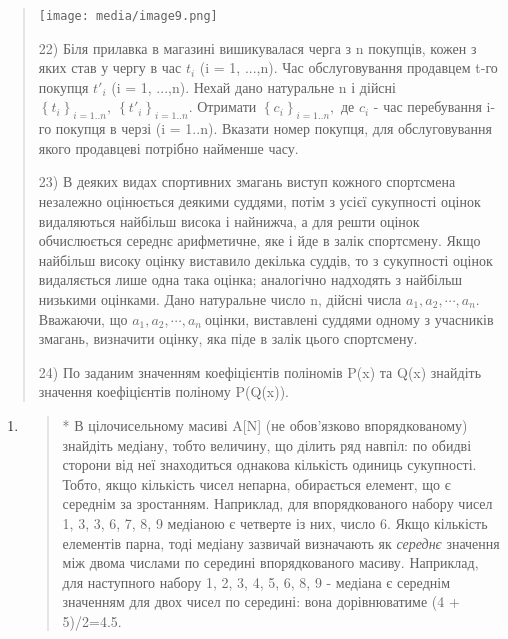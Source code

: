 \documentclass[]{article}
\begin{document}
\begin{quote}
\texttt{[image: media/image9.png]}

22) Біля прилавка в магазині вишикувалася черга з n покупців, кожен з
яких став у чергу в час \(t_{i}\) (i = 1, ...,n). Час обслуговування
продавцем t-го покупця \({t'}_{i}\) (i = 1, ...,n). Нехай дано
натуральне n і дійсні
\(\left\{ t_{i} \right\}_{i = 1..n},\ \left\{ {t'}_{i} \right\}_{i = 1..n}\).
Отримати \(\left\{ c_{i} \right\}_{i = 1..n},\) де \(c_{i}\) - час
перебування i-го покупця в черзі (i = 1..n). Вказати номер покупця, для
обслуговування якого продавцеві потрібно найменше часу.

23) В деяких видах спортивних змагань виступ кожного спортсмена
незалежно оцінюється деякими суддями, потім з усієї сукупності оцінок
видаляються найбільш висока і найнижча, а для решти оцінок обчислюється
середнє арифметичне, яке і йде в залік спортсмену. Якщо найбільш високу
оцінку виставило декілька суддів, то з сукупності оцінок видаляється
лише одна така оцінка; аналогічно надходять з найбільш низькими
оцінками. Дано натуральне число n, дійсні числа
\(a_{1},a_{2},\cdots,a_{n}\). Вважаючи, що
\(a_{1},a_{2},\cdots,a_{n}\ \)оцінки, виставлені суддями одному з
учасників змагань, визначити оцінку, яка піде в залік цього спортсмену.

24) По заданим значенням коефіцієнтів поліномів P(x) та Q(x) знайдіть
значення коефіцієнтів поліному P(Q(x)).
\end{quote}

\begin{enumerate}
\def\labelenumi{\arabic{enumi})}
\setcounter{enumi}{16}
\item
  \begin{quote}
  * В цілочисельному масиві A{[}N{]} (не обов'язково впорядкованому)
  знайдіть медіану, тобто величину, що ділить ряд навпіл: по обидві
  сторони від неї знаходиться однакова кількість одиниць сукупності.
  Тобто, якщо кількість чисел непарна, обирається елемент, що є середнім
  за зростанням. Наприклад, для впорядкованого набору чисел 1, 3, 3, 6,
  7, 8, 9 медіаною є четверте із них, число 6. Якщо кількість елементів
  парна, тоді медіану зазвичай визначають як \emph{середнє} значення між
  двома числами по середині впорядкованого масиву. Наприклад, для
  наступного набору 1, 2, 3, 4, 5, 6, 8, 9 - медіана є середнім
  значенням для двох чисел по середині: вона дорівнюватиме (4 +
  5)/2=4.5.
  \end{quote}
\end{enumerate}
\end{document}
